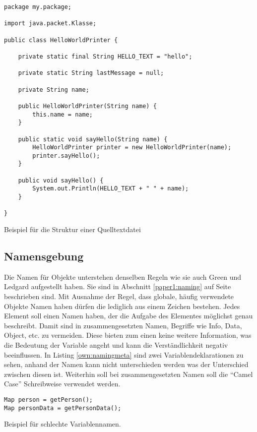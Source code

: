 \begin{listing}[H]
    \begin{verbatim}
package my.package;

import java.packet.Klasse;

public class HelloWorldPrinter {
    
    private static final String HELLO_TEXT = "hello";

    private static String lastMessage = null;

    private String name;

    public HelloWorldPrinter(String name) {
        this.name = name;
    }

    public static void sayHello(String name) {
        HelloWorldPrinter printer = new HelloWorldPrinter(name);
        printer.sayHello();
    }

    public void sayHello() {
        System.out.Println(HELLO_TEXT + " " + name);
    }

}
    \end{verbatim}
    \caption{Beispiel für die Struktur einer Quelltextdatei}
    \label{own:struct}
\end{listing}

\subsection{Namensgebung}
Die Namen für Objekte unterstehen denselben Regeln wie sie auch Green und Ledgard aufgestellt haben. Sie sind in Abschnitt \ref{paper1:naming} auf Seite \pageref{paper1:naming} beschrieben sind. Mit Ausnahme der Regel, dass globale, häufig verwendete Objekte Namen haben dürfen die lediglich aus einem Zeichen bestehen. Jedes Element soll einen Namen haben, der die Aufgabe des Elementes möglichst genau beschreibt. Damit sind in zusammengesetzten Namen, Begriffe wie Info, Data, Object, etc. zu vermeiden. Diese bieten zum einen keine weitere Information,  was die Bedeutung der Variable angeht und kann die Verständlichkeit negativ beeinflussen. In Listing \ref{own:namingmeta} sind zwei Variablendeklarationen zu sehen, anhand der Namen kann nicht unterschieden werden was der Unterschied zwischen diesen ist. Weiterhin soll bei zusammengesetzten Namen soll die \enquote{Camel Case} Schreibweise verwendet werden.

\begin{listing}[H]
    \begin{verbatim}
Map person = getPerson();
Map personData = getPersonData();
    \end{verbatim}
    \caption{Beispiel für schlechte Variablennamen.}
    \label{own:namingmeta}
\end{listing}


